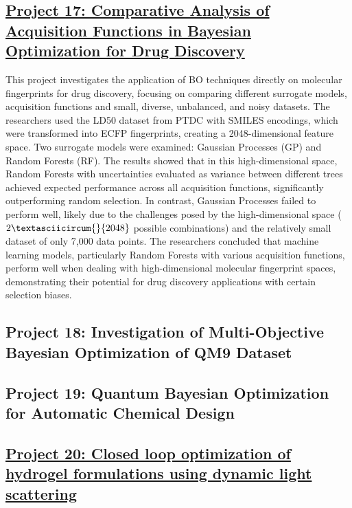  \subsection*{\href{https://www.youtube.com/watch?v=5AjwoZtjgOc}{Project 17: Comparative Analysis of Acquisition Functions in Bayesian Optimization for Drug Discovery}}

This project investigates the application of BO techniques directly on molecular fingerprints for drug discovery, focusing on comparing different surrogate models, acquisition functions and small, diverse, unbalanced, and noisy datasets\cite{bellamy2022batched}. The researchers used the LD50 dataset from PTDC with SMILES encodings\cite{wu2018quantitative,chen2021algebraic}, which were transformed into ECFP fingerprints\cite{rogers2010extended}, creating a 2048-dimensional feature space. Two surrogate models were examined: Gaussian Processes (GP) and Random Forests (RF). The results showed that in this high-dimensional space, Random Forests with uncertainties evaluated as variance between different trees achieved expected performance across all acquisition functions, significantly outperforming random selection. In contrast, Gaussian Processes failed to perform well, likely due to the challenges posed by the high-dimensional space ($2\textasciicircum{}{2048}$ possible combinations) and the relatively small dataset of only 7,000 data points. The researchers concluded that machine learning models, particularly Random Forests with various acquisition functions, perform well when dealing with high-dimensional molecular fingerprint spaces, demonstrating their potential for drug discovery applications with certain selection biases.
 \subsection*{Project 18: Investigation of Multi-Objective Bayesian Optimization of QM9 Dataset}


 \subsection*{Project 19: Quantum Bayesian Optimization for Automatic Chemical Design}


 \subsection*{\href{https://youtu.be/Qbvq7uolQr8}{Project 20: Closed loop optimization of hydrogel formulations using dynamic light scattering}}

